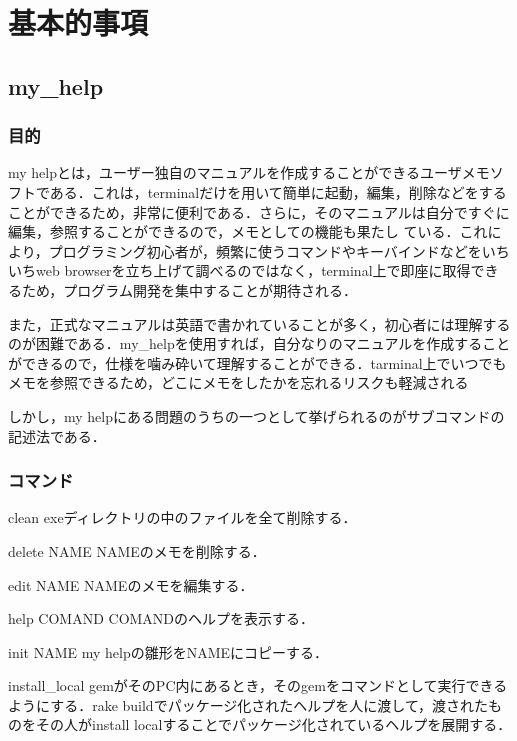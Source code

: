 \chapter{基本的事項}\label{ux57faux672cux7684ux4e8bux9805}

\section{my\_help}\label{my_help}

\subsection{目的}\label{ux76eeux7684}

my
helpとは，ユーザー独自のマニュアルを作成することができるユーザメモソフトである．これは，terminalだけを用いて簡単に起動，編集，削除などをすることができるため，非常に便利である．さらに，そのマニュアルは自分ですぐに編集，参照することができるので，メモとしての機能も果たし
ている．これにより，プログラミング初心者が，頻繁に使うコマンドやキーバインドなどをいちいちweb
browserを立ち上げて調べるのではなく，terminal上で即座に取得できるため，プログラム開発を集中することが期待される．

また，正式なマニュアルは英語で書かれていることが多く，初心者には理解するのが困難である．my\_helpを使用すれば，自分なりのマニュアルを作成することができるので，仕様を噛み砕いて理解することができる．tarminal上でいつでもメモを参照できるため，どこにメモをしたかを忘れるリスクも軽減される

しかし，my
helpにある問題のうちの一つとして挙げられるのがサブコマンドの記述法である．

\subsection{コマンド}\label{ux30b3ux30deux30f3ux30c9}

clean exeディレクトリの中のファイルを全て削除する．

delete NAME NAMEのメモを削除する．

edit NAME NAMEのメモを編集する．

help COMAND COMANDのヘルプを表示する．

init NAME my helpの雛形をNAMEにコピーする．

install\_local
gemがそのPC内にあるとき，そのgemをコマンドとして実行できるようにする．rake
buildでパッケージ化されたヘルプを人に渡して，渡されたものをその人がinstall
localすることでパッケージ化されているヘルプを展開する．

